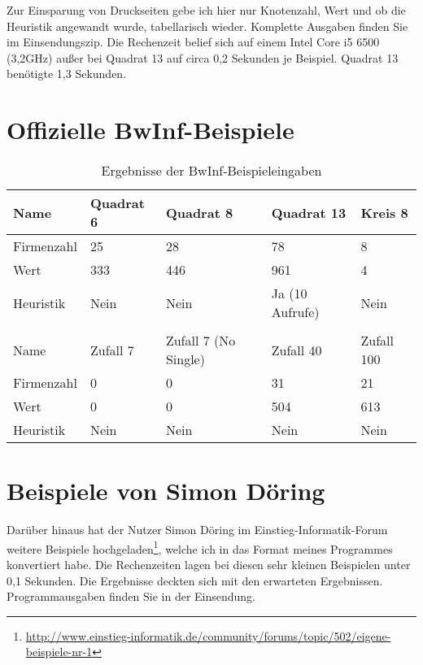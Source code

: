 Zur Einsparung von Druckseiten gebe ich hier nur Knotenzahl, Wert und ob die Heuristik angewandt wurde, tabellarisch wieder. Komplette Ausgaben finden Sie im Einsendungszip. Die Rechenzeit belief sich auf einem Intel Core i5 6500 (3,2GHz) außer bei Quadrat 13 auf circa 0,2 Sekunden je Beispiel. Quadrat 13 benötigte 1,3 Sekunden.

\section {Offizielle BwInf-Beispiele}
\begin{table}[!h]
	\centering
    \begin{tabular}{lllll}
    Name       & Quadrat 6 	& Quadrat 8 				& Quadrat 13      	& Kreis 8		\\ \hline
    Firmenzahl & 25        	& 28        				& 78              	& 8      		\\
    Wert       & 333       	& 446       				& 961             	& 4      		\\
    Heuristik  & Nein      	& Nein      				& Ja (10 Aufrufe) 	& Nein  		\\ \\
    Name       & Zufall 7 	& Zufall 7 (No Single) 		& Zufall 40 		& Zufall 100 	\\ \hline
    Firmenzahl & 0       	& 0                    		& 31        		& 21        	\\
    Wert       & 0        	& 0                    		& 504       		& 613        	\\
    Heuristik  & Nein     	& Nein                 		& Nein      		& Nein      	\\
    \end{tabular}
    \caption{Ergebnisse der BwInf-Beispieleingaben}
\end{table}

\section {Beispiele von Simon Döring}
Darüber hinaus hat der Nutzer Simon Döring im Einstieg-Informatik-Forum weitere Beispiele hochgeladen\footnote{\url{http://www.einstieg-informatik.de/community/forums/topic/502/eigene-beispiele-nr-1}}, welche ich in das Format meines Programmes konvertiert habe. Die Rechenzeiten lagen bei diesen sehr kleinen Beispielen unter 0,1 Sekunden. Die Ergebnisse deckten sich mit den erwarteten Ergebnissen. Programmausgaben finden Sie in der Einsendung.


